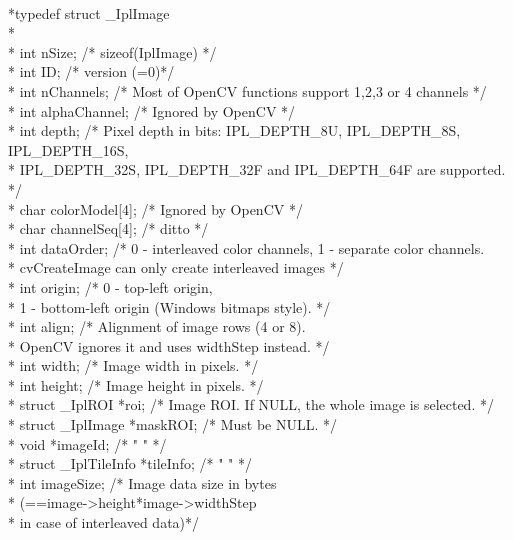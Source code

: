 \documentclass[a4paper,12pt]{article}
\begin{document}
\\*typedef struct \_IplImage
\\*{
\\*    int  nSize;             /* sizeof(IplImage) */
\\*    int  ID;                /* version (=0)*/
\\*    int  nChannels;         /* Most of OpenCV functions support 1,2,3 or 4 channels */
\\*    int  alphaChannel;      /* Ignored by OpenCV */
\\*    int  depth;             /* Pixel depth in bits: IPL\_DEPTH\_8U, IPL\_DEPTH\_8S, IPL\_DEPTH\_16S,
\\*                               IPL\_DEPTH\_32S, IPL\_DEPTH\_32F and IPL\_DEPTH\_64F are supported.  */
\\*    char colorModel[4];     /* Ignored by OpenCV */
\\*    char channelSeq[4];     /* ditto */
\\*    int  dataOrder;         /* 0 - interleaved color channels, 1 - separate color channels.
\\*                               cvCreateImage can only create interleaved images */
\\*    int  origin;            /* 0 - top-left origin,
\\*                               1 - bottom-left origin (Windows bitmaps style).  */
\\*    int  align;             /* Alignment of image rows (4 or 8).
\\*                               OpenCV ignores it and uses widthStep instead.    */
\\*    int  width;             /* Image width in pixels.                           */
\\*    int  height;            /* Image height in pixels.                          */
\\*    struct \_IplROI *roi;    /* Image ROI. If NULL, the whole image is selected. */
\\*    struct \_IplImage *maskROI;      /* Must be NULL. */
\\*    void  *imageId;                 /* "           " */
\\*    struct \_IplTileInfo *tileInfo;  /* "           " */
\\*    int  imageSize;         /* Image data size in bytes
\\*                               (==image->height*image->widthStep
\\*                               in case of interleaved data)*/
}
\end{document}
